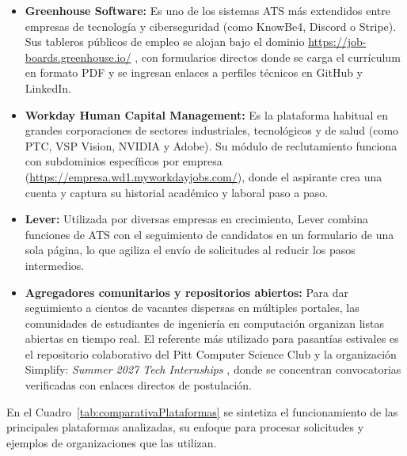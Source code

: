 \documentclass[12pt]{article}
\begin{document}
\begin{itemize}[leftmargin=0.2in, itemsep=0.4em]
    \item \textbf{Greenhouse Software:} Es uno de los sistemas ATS más extendidos entre empresas de tecnología y ciberseguridad (como KnowBe4, Discord o Stripe). Sus tableros públicos de empleo se alojan bajo el dominio \url{https://job-boards.greenhouse.io/} \parencite{greenhouse2026software}, con formularios directos donde se carga el currículum en formato PDF y se ingresan enlaces a perfiles técnicos en GitHub y LinkedIn.

    \item \textbf{Workday Human Capital Management:} Es la plataforma habitual en grandes corporaciones de sectores industriales, tecnológicos y de salud (como PTC, VSP Vision, NVIDIA y Adobe). Su módulo de reclutamiento \parencite{workday2026hcm} funciona con subdominios específicos por empresa (\url{https://empresa.wd1.myworkdayjobs.com/}), donde el aspirante crea una cuenta y captura su historial académico y laboral paso a paso.

    \item \textbf{Lever:} Utilizada por diversas empresas en crecimiento, Lever \parencite{lever2026recruiting} combina funciones de ATS con el seguimiento de candidatos en un formulario de una sola página, lo que agiliza el envío de solicitudes al reducir los pasos intermedios.

    \item \textbf{Agregadores comunitarios y repositorios abiertos:} Para dar seguimiento a cientos de vacantes dispersas en múltiples portales, las comunidades de estudiantes de ingeniería en computación organizan listas abiertas en tiempo real. El referente más utilizado para pasantías estivales es el repositorio colaborativo del Pitt Computer Science Club y la organización Simplify: \textit{Summer 2027 Tech Internships} \parencite{simplifyjobs2026summer}, donde se concentran convocatorias verificadas con enlaces directos de postulación.
\end{itemize}

En el Cuadro~\ref{tab:comparativaPlataformas} se sintetiza el funcionamiento de las principales plataformas analizadas, su enfoque para procesar solicitudes y ejemplos de organizaciones que las utilizan.
\end{document}
